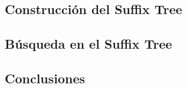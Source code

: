 \documentclass[letterpaper,10pt]{article}
\begin{document}
	\subsection{Construcción del Suffix Tree}


	\subsection{Búsqueda en el Suffix Tree}


	\subsection{Conclusiones}

\end{document}
